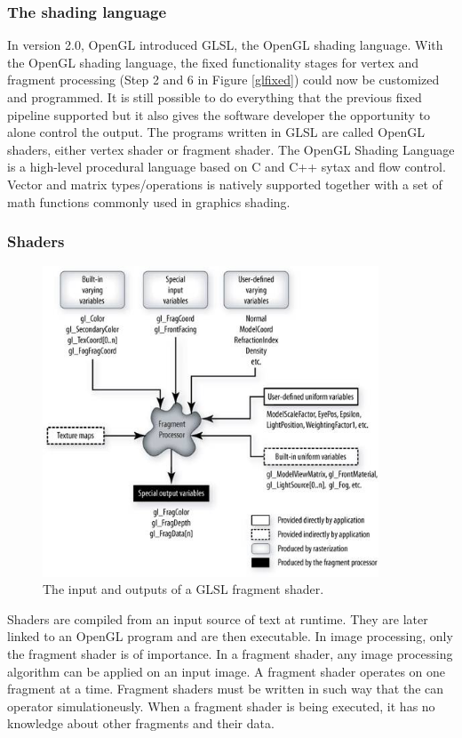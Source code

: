 \subsubsection{The shading language}

In version 2.0, OpenGL introduced GLSL, the OpenGL shading language. With the OpenGL shading language, the fixed functionality stages for vertex and fragment processing (Step 2 and 6 in Figure \ref{glfixed}) could now be customized and programmed. It is still possible to do everything that the previous fixed pipeline supported but it also gives the software developer the opportunity to alone control the output. The programs written in GLSL are called OpenGL shaders, either vertex shader or fragment shader. The OpenGL Shading Language is a high-level procedural language based on C and C++ sytax and flow control. Vector and matrix types/operations is natively supported together with a set of  math functions commonly used in graphics shading.
\newline

\subsubsection{Shaders}

\begin{figure}[ht!]
\centering
\includegraphics[width=100mm]{img/frag-gl.jpg}
\caption{The input and outputs of a GLSL fragment shader.}
\label{glfrag}
\end{figure}

Shaders are compiled from an input source of text at runtime. They are later linked to an OpenGL program and are then executable. In image processing, only the fragment shader is of importance. In a fragment shader, any image processing algorithm can be applied on an input image. A fragment shader operates on one fragment at a time. Fragment shaders must be written in such way that the can operator simulationeusly. When a fragment shader is being executed, it has no knowledge about other fragments and their data. 
\newline

